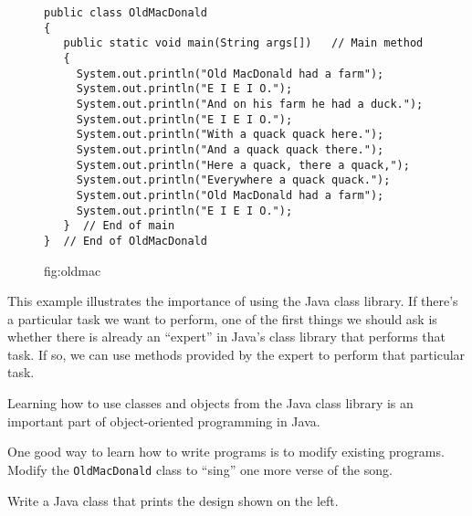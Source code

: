 \begin{figure}[h]
\jjjprogstart
\begin{jjjlisting}
\begin{lstlisting}
public class OldMacDonald
{
   public static void main(String args[])   // Main method
   {
     System.out.println("Old MacDonald had a farm");
     System.out.println("E I E I O.");
     System.out.println("And on his farm he had a duck.");
     System.out.println("E I E I O.");
     System.out.println("With a quack quack here.");
     System.out.println("And a quack quack there.");
     System.out.println("Here a quack, there a quack,");
     System.out.println("Everywhere a quack quack.");
     System.out.println("Old MacDonald had a farm");
     System.out.println("E I E I O.");
   }  // End of main
}  // End of OldMacDonald
\end{lstlisting}
\end{jjjlisting}
{fig:oldmac}

\end{figure}

This example illustrates the importance of using the Java class
library.  If there's a particular task we want to perform, one of the
first things we should ask is whether there is already an ``expert''
in Java's class library that performs that task.  If so, we can use
methods provided by the expert to perform that particular task.

 {Learning how to use
classes and objects from the Java class library is an important
part of object-oriented programming in Java.}

\label{self-study-exercises}
\begin{SSTUDY}
\marginnote{\small\tt
**********\\
\mbox{*}\mbox{ }**\mbox{ }\mbox{ }**\mbox{ }*\\
\mbox{*}\mbox{ }\mbox{ }\mbox{ }**\mbox{ }\mbox{ }\mbox{ }*\\
\mbox{*}\mbox{ }*\mbox{ }\mbox{ }\mbox{ }\mbox{ }*\mbox{ }*\\
\mbox{*}\mbox{ }\mbox{ }****\mbox{ }\mbox{ }*\\
\mbox{*}*********
}

\item One good way to learn how to write programs is to modify existing
programs.   Modify the {\tt OldMacDonald} class to ``sing'' one more
verse of the song.

\item Write a Java class that prints the design shown on the left.

\end{SSTUDY}

